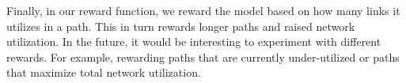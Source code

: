 \documentclass[conference]{IEEEtran}
\begin{document}
Finally, in our reward function, we reward the model based on how many links it utilizes in a path. This in turn rewards longer paths and raised network utilization. In the future, it would be interesting to experiment with different rewards. For example, rewarding paths that are currently under-utilized or paths that maximize total network utilization.







\end{document}
